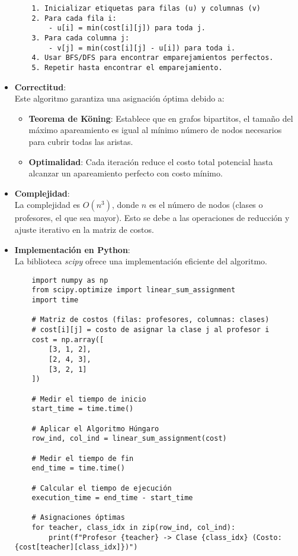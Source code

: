 \documentclass[12pt, a4paper]{article}
\begin{document}
\begin{itemize}
\begin{verbatim}
    1. Inicializar etiquetas para filas (u) y columnas (v)
    2. Para cada fila i:
        - u[i] = min(cost[i][j]) para toda j.
    3. Para cada columna j:
        - v[j] = min(cost[i][j] - u[i]) para toda i.
    4. Usar BFS/DFS para encontrar emparejamientos perfectos.
    5. Repetir hasta encontrar el emparejamiento.
    \end{verbatim}
    \item \textbf{Correctitud}: \\
    Este algoritmo garantiza una asignación óptima debido a:
    \begin{itemize}
        \item \textbf{Teorema de Köning}: Establece que en grafos bipartitos, el tamaño del máximo apareamiento es igual al mínimo número de nodos necesarios para cubrir todas las aristas.
        \item \textbf{Optimalidad}: Cada iteración reduce el costo total potencial hasta alcanzar un apareamiento perfecto con costo mínimo.
    \end{itemize}
    \item \textbf{Complejidad}:\\
    La complejidad es $O(n^3)$, donde $n$ es el número de nodos (clases o profesores, el que sea mayor). Esto se debe a las operaciones de reducción y ajuste iterativo en la matriz de costos.
    \item \textbf{Implementación en Python}:\\
    La biblioteca \textit{scipy} ofrece una implementación eficiente del algoritmo. 
    \begin{verbatim}
    import numpy as np
    from scipy.optimize import linear_sum_assignment
    import time
    
    # Matriz de costos (filas: profesores, columnas: clases)
    # cost[i][j] = costo de asignar la clase j al profesor i
    cost = np.array([
        [3, 1, 2],
        [2, 4, 3],
        [3, 2, 1]
    ])
    
    # Medir el tiempo de inicio
    start_time = time.time()
    
    # Aplicar el Algoritmo Húngaro
    row_ind, col_ind = linear_sum_assignment(cost)
    
    # Medir el tiempo de fin
    end_time = time.time()
    
    # Calcular el tiempo de ejecución
    execution_time = end_time - start_time
    
    # Asignaciones óptimas
    for teacher, class_idx in zip(row_ind, col_ind):
        print(f"Profesor {teacher} -> Clase {class_idx} (Costo: {cost[teacher][class_idx]})")
    

\end{verbatim}
\end{itemize}
\end{document}
